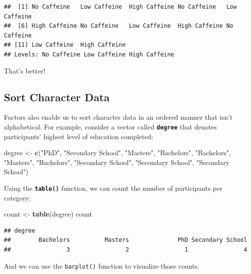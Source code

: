 \documentclass[
]{book}
\newenvironment{Shaded}{\begin{snugshade}}{\end{snugshade}}
\newcommand{\FunctionTok}[1]{\textcolor[rgb]{0.13,0.29,0.53}{\textbf{#1}}}
\newcommand{\NormalTok}[1]{#1}
\newcommand{\OtherTok}[1]{\textcolor[rgb]{0.56,0.35,0.01}{#1}}
\newcommand{\StringTok}[1]{\textcolor[rgb]{0.31,0.60,0.02}{#1}}
\begin{document}
\begin{verbatim}
##  [1] No Caffeine   Low Caffeine  High Caffeine No Caffeine   Low Caffeine 
##  [6] High Caffeine No Caffeine   Low Caffeine  High Caffeine No Caffeine  
## [11] Low Caffeine  High Caffeine
## Levels: No Caffeine Low Caffeine High Caffeine
\end{verbatim}

That's better!

\hypertarget{sort-character-data}{%
\subsection{Sort Character Data}\label{sort-character-data}}

Factors also enable us to sort character data in an ordered manner that isn't alphabetical. For example, consider a vector called \textbf{\texttt{degree}} that denotes participants' highest level of education completed:

\begin{Shaded}
\begin{Highlighting}[]
\NormalTok{degree }\OtherTok{\textless{}{-}} \FunctionTok{c}\NormalTok{(}\StringTok{"PhD"}\NormalTok{, }\StringTok{"Secondary School"}\NormalTok{, }\StringTok{"Masters"}\NormalTok{, }\StringTok{"Bachelors"}\NormalTok{, }\StringTok{"Bachelors"}\NormalTok{, }\StringTok{"Masters"}\NormalTok{, }\StringTok{"Bachelors"}\NormalTok{, }\StringTok{"Secondary School"}\NormalTok{, }\StringTok{"Secondary School"}\NormalTok{, }\StringTok{"Secondary School"}\NormalTok{)}
\end{Highlighting}
\end{Shaded}

Using the \textbf{\texttt{table()}} function, we can count the number of participants per category:

\begin{Shaded}
\begin{Highlighting}[]
\NormalTok{count }\OtherTok{\textless{}{-}} \FunctionTok{table}\NormalTok{(degree)}
\NormalTok{count}
\end{Highlighting}
\end{Shaded}

\begin{verbatim}
## degree
##        Bachelors          Masters              PhD Secondary School 
##                3                2                1                4
\end{verbatim}

And we can use the \texttt{barplot()} function to visualize those counts.
\end{document}
